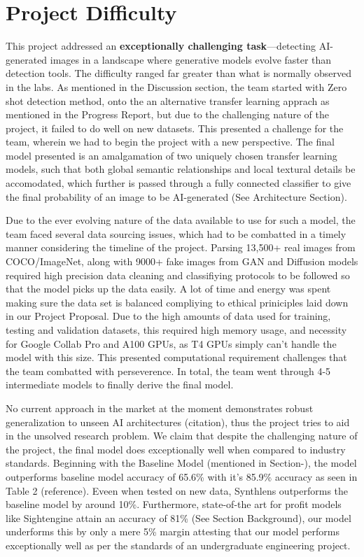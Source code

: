 \documentclass{article} %
\begin{document}
\section{Project Difficulty}

This project addressed an \textbf{exceptionally challenging task}—detecting AI-generated images in a landscape where generative models evolve faster than detection tools. The difficulty ranged far greater than what is normally observed in the labs. As mentioned in the Discussion section, the team started with Zero shot detection method, onto the 
an alternative transfer learning apprach as mentioned in the Progress Report, but due to the challenging nature of the project, it failed to do well on new datasets. This presented a challenge for the team, wherein we had to begin the project with a new perspective. The final model presented is an amalgamation of two uniquely chosen transfer learning models, such that both global semantic relationships and local textural details be accomodated, which further is passed through a fully connected classifier to give the final probability of an image to be AI-generated (See Architecture Section).

Due to the ever evolving nature of the data available to use for such a model, the team faced several data sourcing issues, which had to be combatted in a timely manner considering the timeline of the project. Parsing 13,500+ real images from COCO/ImageNet, along with 9000+ fake images from GAN and Diffusion models required high precision data cleaning and classifiying protocols to be followed so that the model picks up the data easily. A lot of time and energy was spent making sure the data set is balanced compliying to ethical priniciples laid down in our Project Proposal.
Due to the high amounts of data used for training, testing and validation datasets, this required high memory usage, and necessity for Google Collab Pro and A100 GPUs, as T4 GPUs simply can't handle the model with this size. This presented computational requirement challenges that the team combatted with perseverence.
In total, the team went through 4-5 intermediate models to finally derive the final model.

No current approach in the market at the moment demonstrates robust generalization to unseen AI architectures (citation), thus the project tries to aid in the unsolved research problem. We claim that despite the challenging nature of the project, the final model does exceptionally well when compared to industry standards.
Beginning with the Baseline Model (mentioned in Section-), the model outperforms baseline model accuracy of 65.6\% with it's 85.9\% accuracy as seen in Table 2 (reference). Eveen when tested on new data, Synthlens outperforms the baseline model by around 10\%.
Furthermore, state-of-the art for profit models like Sightengine attain an accuracy of 81\% (See Section Background), our model underforms this by only a mere 5\% margin attesting that our model performs exceptionally well as per the standards of an undergraduate engineering project.

\label{last_page}



\end{document}
